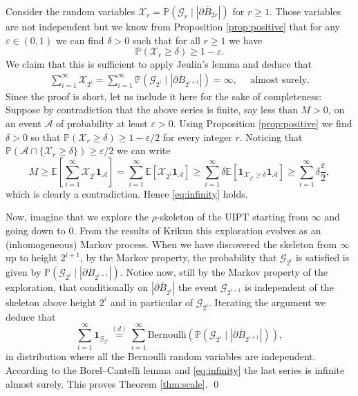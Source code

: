 \documentclass[10pt]{amsart}
\theoremstyle{definition}\newtheorem{defi}[theo]{Definition}\newtheorem{rema}[theo]{Remark}\newtheorem{exam}[theo]{Example}\newtheorem{exem}[theo]{Example}\newtheorem{nota}[theo]{Notation}
\begin{document}
Consider the random variables $ \mathcal{X}_{r}= \mathbb{P}( \mathcal{G}_{r} \mid | \partial \overline{B}_{2r}|)$ for $r \geq 1$. Those variables are not independent but we know from Proposition \ref{prop:positive} that for any $ \varepsilon \in (0,1)$ we can find $\delta>0$ such that for all $r \geq 1$ we have
$$ \mathbb{P}( \mathcal{X}_{r} \geq \delta) \geq 1- \varepsilon.$$ We claim that this is sufficient to apply Jeulin's lemma \cite[Proposition 4 c]{Jeu82} and deduce that
 \begin{eqnarray} \sum_{i=1}^{\infty} \mathcal{X}_{2^{i}} = \sum_{i =1}^{\infty} \mathbb{P}( \mathcal{G}_{2^{i}} \mid | \partial \overline{B}_{2^{i+1}}|) = \infty, \quad \mbox{ almost surely}.   \label{eq:infinity}\end{eqnarray}
 Since the proof is short, let us include it here for the sake of completeness: Suppose by contradiction that the above series is finite, say less than $M>0$, on an event $ \mathcal{A}$ of probability at least $\varepsilon>0$. Using Proposition \ref{prop:positive} we find $\delta >0$ so that $\mathbb{P}( \mathcal{X}_{r} \geq \delta) \geq 1- \varepsilon/2$ for every integer $r$. Noticing that $ \mathbb{P}( \mathcal{A} \cap \{ \mathcal{X}_{r} \geq \delta\}) \geq \varepsilon/2$ we can write
 $$ M \geq \mathbb{E}\left[ \sum_{i=1}^{\infty} \mathcal{X}_{2^{i}} \mathbf{1}_{ \mathcal{A}}\right] = \sum_{i=1}^{\infty}  \mathbb{E}[ \mathcal{X}_{2^{i}} \mathbf{1}_{ \mathcal{A}} ] \geq  \sum_{i=1}^{\infty}  \delta \mathbb{E}[  \mathbf{1}_{ \mathcal{X}_{2^{i}} \geq \delta} \mathbf{1}_{ \mathcal{A}} ] \geq \sum_{i=1}^{\infty} \delta \frac{ \varepsilon}{2},$$ which is clearly a contradiction. Hence \eqref{eq:infinity} holds.\medskip


Now, imagine that we explore the $\rho$-skeleton of the UIPT starting from $\infty$ and going down to $0$. From the results of Krikun \cite{Kr,CLGfpp} this exploration evolves as an (inhomogeneous) Markov process. When we have discovered the skeleton from $\infty$ up to height $2^{i+1}$, by the Markov property, the probability that $ \mathcal{G}_{2^{i}}$ is satisfied is given by $ \mathbb{P}( \mathcal{G}_{2^{i}} \mid | \partial \overline{B}_{2^{i+1}}|)$. Notice now, still by the Markov property of the exploration, that conditionally on $ | \partial \overline{B}_{2^{i}}|$ the event $  \mathcal{G}_{2^{i-1}}$ is independent of the skeleton above height $2^{i}$ and in particular of $ \mathcal{G}_{2^{i}}$. Iterating the argument we deduce that
$$ \sum_{i =1}^{\infty}  \mathbf{1}_{\mathcal{G}_{2^{i}}}  \overset{(d)}{=}  \sum_{i=1}^{\infty} \mathrm{Bernoulli}(\mathbb{P}( \mathcal{G}_{2^{i}} \mid | \partial \overline{B}_{2^{i+1}}|)),$$ in distribution where all the Bernoulli random variables are independent. According to the Borel--Cantelli lemma and \eqref{eq:infinity} the last series is infinite almost surely. This proves Theorem \ref{thm:scale}. \qed
\end{document}
